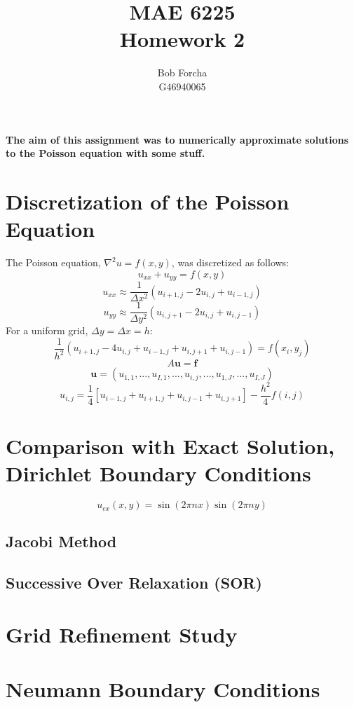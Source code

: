 \documentclass[12pt,a4paper]{report}
\author{Bob Forcha\\G46940065}
\title{MAE 6225\\Homework 2}
\begin{document}
\begin{titlepage}
\maketitle
\end{titlepage}
\paragraph{The aim of this assignment was to numerically approximate solutions to the Poisson equation
with some stuff.}
\section{Discretization of the Poisson Equation}
The Poisson equation, $\nabla^2u = f\left(x,y\right)$, was discretized as follows:
$$u_{xx} + u_{yy} = f\left(x,y\right)$$
$$u_{xx}\approx\frac{1}{\Delta x^2}\left(u_{i+1,j} - 2u_{i,j} + u_{i-1,j}\right)$$
$$u_{yy}\approx\frac{1}{\Delta y^2}\left(u_{i,j+1} - 2u_{i,j} + u_{i,j-1}\right)$$
For a uniform grid, $\Delta y = \Delta x = h$:
$$\frac{1}{h^2}\left(u_{i+1,j} - 4u_{i,j} + u_{i-1,j} + u_{i,j+1} + u_{i,j-1}\right)
= f\left(x_i,y_j\right)$$
$$A\mathbf{u} = \mathbf{f}$$
$$\mathbf{u} =\left(u_{1,1},...,u_{I,1},...,u_{i,j},...,u_{1,J},...,u_{I,J}\right)$$
$$u_{i,j} = \frac{1}{4}\left[u_{i-1,j} + u_{i+1,j} + u_{i,j-1} + u_{i,j+1}\right]
 - \frac{h^2}{4}f\left(i,j\right)$$
\section{Comparison with Exact Solution, Dirichlet Boundary Conditions}
$$u_{ex}\left(x,y\right) = \sin\left(2\pi n x\right)\sin\left(2\pi n y\right)$$
\subsection{Jacobi Method}
\subsection{Successive Over Relaxation (SOR)}
\section{Grid Refinement Study}
\section{Neumann Boundary Conditions}
\end{document}
